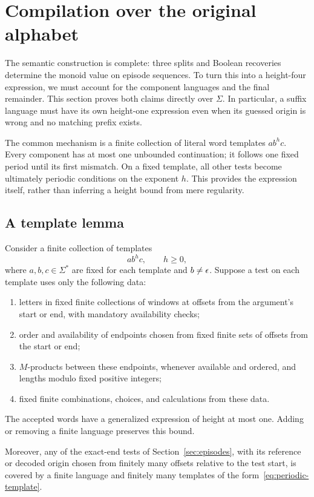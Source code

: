 \section{Compilation over the original alphabet}
\label{sec:compilation}

The semantic construction is complete: three splits and Boolean
recoveries determine the monoid value on episode sequences. To turn this
into a height-four expression, we must account for the component languages
and the final remainder. This section proves both claims directly over
$\Sigma$. In particular, a suffix language must have its own height-one
expression even when its guessed origin is wrong and no matching prefix
exists.

The common mechanism is a finite collection of literal word templates
$a b^h c$. Every component has at most one unbounded continuation; it
follows one fixed period until its first mismatch. On a fixed template,
all other tests become ultimately periodic conditions on the exponent
$h$. This provides the expression itself, rather than inferring a height
bound from mere regularity.

\subsection{A template lemma}

\begin{lemma}
\label{lem:templates}
Consider a finite collection of templates
\begin{equation}
 \label{eq:periodic-template}
 a b^h c,\qquad h\ge0,
\end{equation}
where $a,b,c\in\Sigma^*$ are fixed for each template and $b\ne\epsilon$.
Suppose a test on each template uses only the following data:
\begin{enumerate}[label=\textup{(\roman*)}]
\item letters in fixed finite collections of windows at offsets from
the argument's start or end, with mandatory availability checks;
\item order and availability of endpoints chosen from fixed finite sets
of offsets from the start or end;
\item $M$-products between these endpoints, whenever available and
ordered, and lengths modulo fixed positive integers;
\item fixed finite combinations, choices, and calculations from these
data.
\end{enumerate}
The accepted words have a generalized expression of height at most one.
Adding or removing a finite language preserves this bound.

Moreover, any of the exact-end tests of Section~\ref{sec:episodes},
with its reference or decoded origin chosen from finitely many offsets
relative to the test start, is covered by a finite language and finitely
many templates of the form~\eqref{eq:periodic-template}.
\end{lemma}

